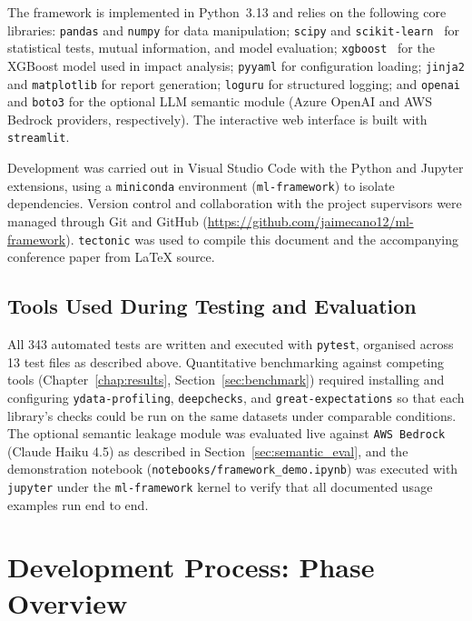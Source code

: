 \documentclass[12pt,a4paper]{report}
\begin{document}
The framework is implemented in Python~3.13 and relies on the following core libraries:
\texttt{pandas} and \texttt{numpy} for data manipulation; \texttt{scipy} and
\texttt{scikit-learn}~\cite{pedregosa2011} for statistical tests, mutual information, and
model evaluation; \texttt{xgboost}~\cite{chen2016} for the XGBoost model used in impact
analysis; \texttt{pyyaml} for configuration loading; \texttt{jinja2} and \texttt{matplotlib}
for report generation; \texttt{loguru} for structured logging; and \texttt{openai} and
\texttt{boto3} for the optional LLM semantic module (Azure OpenAI and AWS Bedrock providers,
respectively).  The interactive web interface is built with \texttt{streamlit}.

Development was carried out in Visual Studio Code with the Python and Jupyter extensions,
using a \texttt{miniconda} environment (\texttt{ml-framework}) to isolate dependencies.
Version control and collaboration with the project supervisors were managed through Git and
GitHub (\url{https://github.com/jaimecano12/ml-framework}).  \texttt{tectonic} was used to
compile this document and the accompanying conference paper from \LaTeX{} source.

\subsection{Tools Used During Testing and Evaluation}
\label{sec:testingtools}

All 343 automated tests are written and executed with \texttt{pytest}, organised across 13
test files as described above.  Quantitative benchmarking against competing tools
(Chapter~\ref{chap:results}, Section~\ref{sec:benchmark}) required installing and configuring
\texttt{ydata-profiling}, \texttt{deepchecks}, and \texttt{great-expectations} so that each
library's checks could be run on the same datasets under comparable conditions.  The optional
semantic leakage module was evaluated live against \texttt{AWS Bedrock} (Claude Haiku 4.5)
as described in Section~\ref{sec:semantic_eval}, and the
demonstration notebook (\texttt{notebooks/framework\_demo.ipynb}) was executed with
\texttt{jupyter} under the \texttt{ml-framework} kernel to verify that all documented usage
examples run end to end.

\section{Development Process: Phase Overview}
\label{sec:phases}
\end{document}
